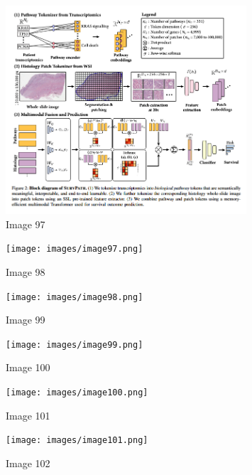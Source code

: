 \documentclass{article}%
\begin{document}
\begin{figure}[h!]%
\centering%
\includegraphics[width=0.8\textwidth]{images/image96.png}%
\caption{Image 97}%
\end{figure}

%


\begin{figure}[h!]%
\centering%
\texttt{[image: images/image97.png]}%
\caption{Image 98}%
\end{figure}

%


\begin{figure}[h!]%
\centering%
\texttt{[image: images/image98.png]}%
\caption{Image 99}%
\end{figure}

%


\begin{figure}[h!]%
\centering%
\texttt{[image: images/image99.png]}%
\caption{Image 100}%
\end{figure}

%


\begin{figure}[h!]%
\centering%
\texttt{[image: images/image100.png]}%
\caption{Image 101}%
\end{figure}

%


\begin{figure}[h!]%
\centering%
\texttt{[image: images/image101.png]}%
\caption{Image 102}%
\end{figure}

%
\end{document}
